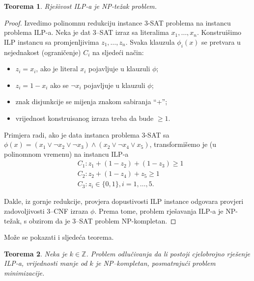 \documentclass[a4paper, utf8, 11pt, colorlinks]{book}
\newtheorem{thm}{Teorema}[chapter]
\theoremstyle{definition}
\begin{document}
   \begin{thm}
   	  Rješivost ILP-a je NP-težak problem.
   \end{thm}
   \begin{proof}
   	   Izvedimo polinomnu redukciju instance 3-SAT problema na instancu problema ILP-a. Neka je dat 3--SAT izraz sa literalima  
   	   $x_1,\ldots, x_n$.  Konstruišimo ILP instancu sa promjenljivima $z_1, \ldots, z_n$.
   	   Svaka klauzula $\phi_i(x)$ se pretvara u nejednakost (ograničenje)  $C_i$ na sljedeći način:
   	   \begin{itemize}
   	   	\item $z_i = x_i$, ako je literal $x_i$ pojavljuje u klauzuli $\phi$; 
   	   	\item $z_i = 1 - x_i$ ako se $\neg x_i$ pojavljuje u klauzuli $\phi$;
   	   	\item znak disjunkcije se mijenja znakom sabiranja ``+'';
   	   	\item vrijednost konstruisanog izraza treba da bude $\geq 1$. 
   	   \end{itemize}
   	   	       Primjera radi, ako je data instanca problema 3-SAT sa 
   	   	      $\phi(x) = (x_1 \vee \neg x_2 \vee \neg x_3) \wedge ( x_2 \vee \neg x_4 \vee x_5 )$, transformišemo je (u polinomnom vremenu) na instancu ILP-a
   	   	      \begin{align*}
   	   	         	 &C_1: z_1 + (1- z_2) + (1 - z_3 ) \geq 1 \\
   	   	         	 &C_2: z_2 + (1-z_4)  + z_5 \geq 1 \\
   	   	         	 &C_3: z_i \in \{0,1\}, i=1,\ldots,5.
   	   	      \end{align*} 

   	   Dakle, iz gornje redukcije,  provjera dopustivosti ILP instance odgovara provjeri zadovoljivosti 3--CNF izraza $\phi$.   Prema tome, problem rješavanja ILP-a je NP-težak, s obzirom da je 3--SAT problem NP-kompletan. 
   \end{proof} 
 Može se pokazati i sljedeća teorema.
 \begin{thm} Neka je $k\in \mathbb{Z}$.
 	 Problem odlučivanja da li postoji cjelobrojno rješenje  ILP-a,  vrijednosti manje od $k$ je NP--kompletan, posmatrajući problem minimizacije. 
 \end{thm}
 
\end{document}
